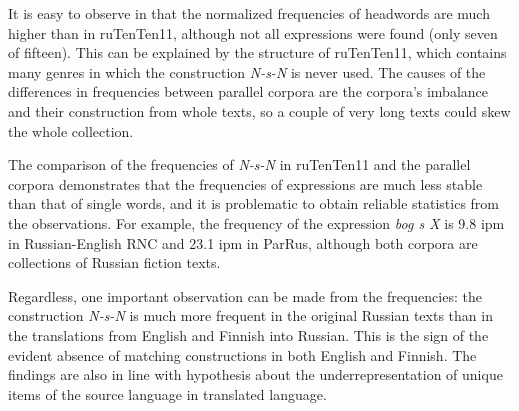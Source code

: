 \documentclass[output=paper]{langscibook}
\begin{document}
\begin{table}
\caption{Frequencies of the headwords N-s-N construction in the parallel corpora.\label{tab:mikhailov:3}}
\end{table}

It is easy to observe in  that the normalized frequencies of headwords are much higher than in ruTenTen11, although not all expressions were found (only seven of fifteen). This can be explained by the structure of ruTenTen11, which contains many genres in which the construction \textit{N-s-N} is never used. The causes of the differences in frequencies between parallel corpora are the corpora’s imbalance and their construction from whole texts, so a couple of very long texts could skew the whole collection.

The comparison of the frequencies of \textit{N-s-N} in ruTenTen11 and the parallel corpora demonstrates that the frequencies of expressions are much less stable than that of single words, and it is problematic to obtain reliable statistics from the observations. For example, the frequency of the expression \textit{bog s X} is 9.8 ipm in Russian-English RNC and 23.1 ipm in ParRus, although both corpora are collections of Russian fiction texts.

Regardless, one important observation can be made from the frequencies: the construction \textit{N-s-N} is much more frequent in the original Russian texts than in the translations from English and Finnish into Russian. This is the sign of the evident absence of matching constructions in both English and Finnish. The findings are also in line with  hypothesis about the underrepresentation of unique items of the source language in translated language.
\end{document}
